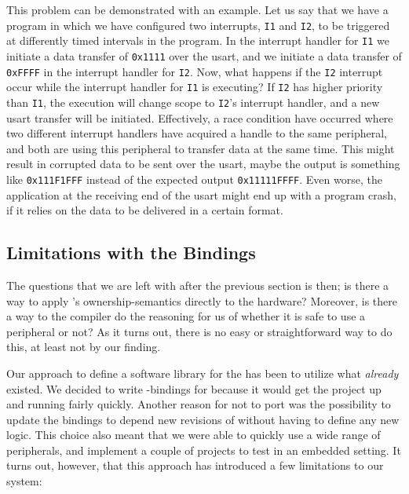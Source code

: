 This problem can be demonstrated with an example.
Let us say that we have a program in which we have configured two interrupts, \texttt{I1} and \texttt{I2}, to be triggered at differently timed intervals in the program.
In the interrupt handler for \texttt{I1} we initiate a data transfer of \texttt{0x1111} over the \gls{usart}, and we initiate a data transfer of \texttt{0xFFFF} in the interrupt handler for \texttt{I2}.
Now, what happens if the \texttt{I2} interrupt occur while the interrupt handler for \texttt{I1} is executing?
If \texttt{I2} has higher priority than \texttt{I1}, the execution will change scope to \texttt{I2}'s interrupt handler, and a new \gls{usart} transfer will be initiated.
Effectively, a race condition have occurred where two different interrupt handlers have acquired a handle to the same peripheral, and both are using this peripheral to transfer data at the same time.
This might result in corrupted data to be sent over the \gls{usart}, maybe the output is something like \texttt{0x111F1FFF} instead of the expected output \texttt{0x11111FFFF}.
Even worse, the application at the receiving end of the \gls{usart} might end up with a program crash, if it relies on the data to be delivered in a certain format.

\subsection{Limitations with the Bindings}

The questions that we are left with after the previous section is then; is there a way to apply {\rust}'s ownership-semantics directly to the hardware?
Moreover, is there a way to the {\rust} compiler do the reasoning for us of whether it is safe to use a peripheral or not?
As it turns out, there is no easy or straightforward way to do this, at least not by our finding.

Our approach to define a software library for the {\gecko} has been to utilize what \emph{already} existed.
We decided to write {\rust}-bindings for {\emlib} because it would get the project up and running fairly quickly.
Another reason for not to port {\emlib} was the possibility to update the bindings to depend new revisions of {\emlib} without having to define any new logic.
This choice also meant that we were able to quickly use a wide range of peripherals, and implement a couple of projects to test {\rust} in an embedded setting.
It turns out, however, that this approach has introduced a few limitations to our system:

